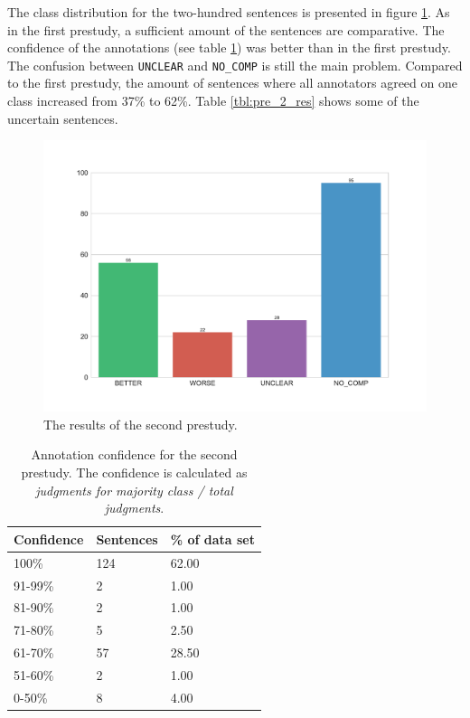 The class distribution for the two-hundred sentences is presented in figure \ref{fig:dist_pre_b}.  As in the first prestudy, a sufficient amount of the sentences are comparative. The confidence of the annotations (see table \ref{tbl:pre_b_agg}) was better than in the first prestudy. The confusion between \texttt{UNCLEAR} and \texttt{NO\_COMP} is still the main problem. Compared to the first prestudy, the amount of sentences where all annotators agreed on one class increased from 37\% to 62\%. Table \ref{tbl:pre_2_res} shows some of the uncertain sentences.


\begin{figure}[tb]
\centering
\caption{The results of the second prestudy.}
\label{fig:dist_pre_b}
\includegraphics[width=1\linewidth]{images/dataset/preb-dist}
\end{figure}


\begin{table}[tp]
\caption{Annotation confidence for the second prestudy. The confidence is calculated as \emph{judgments for majority class / total judgments}.}
\label{tbl:pre_b_agg}
\begin{tabularx}{\textwidth}{XXX}
\toprule
Confidence & Sentences & \% of data set \\
\midrule
100\%	&	124	&	62.00	 \\ 
91-99\%	&	2	&	1.00	 \\ 
81-90\%	&	2	&	1.00	 \\ 
71-80\%	&	5	&	2.50	 \\ 
61-70\%	&	57	&	28.50	 \\ 
51-60\%	&	2	&	1.00	 \\ 
0-50\%	&	8	&	4.00	 \\ 
\bottomrule
\end{tabularx}
\end{table}



